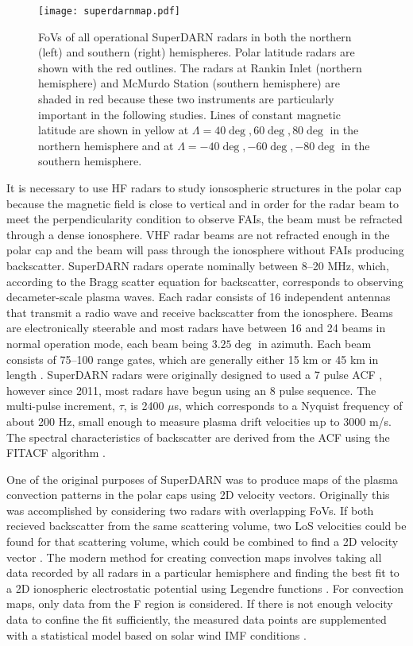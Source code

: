 \begin{figure}
	\texttt{[image: superdarnmap.pdf]}
	\caption{FoVs of all operational SuperDARN radars in both the northern (left) and southern (right) hemispheres.  Polar latitude radars are shown with the red outlines.  The radars at Rankin Inlet (northern hemisphere) and McMurdo Station (southern hemisphere) are shaded in red because these two instruments are particularly important in the following studies.  Lines of constant magnetic latitude are shown in yellow at \(\Lambda = 40\deg, 60\deg, 80\deg\) in the northern hemisphere and at \(\Lambda = -40\deg,-60\deg,-80\deg\) in the southern hemisphere.}
	\label{fig:superdarnmap}
\end{figure}

It is necessary to use HF radars to study ionsospheric structures in the polar cap because the magnetic field is close to vertical and in order for the radar beam to meet the perpendicularity condition to observe FAIs, the beam must be refracted through a dense ionosphere.  VHF radar beams are not refracted enough in the polar cap and the beam will pass through the ionosphere without FAIs producing backscatter.  SuperDARN radars operate nominally between 8--20 MHz, which, according to the Bragg scatter equation for backscatter, corresponds to observing decameter-scale plasma waves.  Each radar consists of 16 independent antennas that transmit a radio wave and receive backscatter from the ionosphere.  Beams are electronically steerable and most radars have between 16 and 24 beams in normal operation mode, each beam being \(3.25\deg\) in azimuth.  Each beam consists of 75--100 range gates, which are generally either 15 km or 45 km in length \citep{Chisham2007}.  SuperDARN radars were originally designed to used a 7 pulse ACF \citep{Farley1972,Greenwald1983,Greenwald1985}, however since 2011, most radars have begun using an 8 pulse sequence.   The multi-pulse increment, \(\tau\), is 2400 \(\mu\)s, which corresponds to a Nyquist frequency of about 200 Hz, small enough to measure plasma drift velocities up to 3000 m/s.  The spectral characteristics of backscatter are derived from the ACF using the FITACF algorithm \citep{Ponomarenko2006}.

One of the original purposes of SuperDARN was to produce maps of the plasma convection patterns in the polar caps using 2D velocity vectors.  Originally this was accomplished by considering two radars with overlapping FoVs.  If both recieved backscatter from the same scattering volume, two LoS velocities could be found for that scattering volume, which could be combined to find a 2D velocity vector \citep{Ruohoniemi1989}.  The modern method for creating convection maps involves taking all data recorded by all radars in a particular hemisphere and finding the best fit to a 2D ionospheric electrostatic potential using Legendre functions \citep{Ruohoniemi1998}.  For convection maps, only data from the F region is considered.  If there is not enough velocity data to confine the fit sufficiently, the measured data points are supplemented with a statistical model based on solar wind IMF conditions \citep{Ruohoniemi1995,Ruohonieme2005}.

